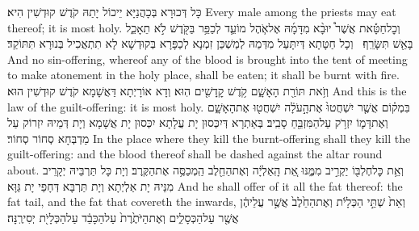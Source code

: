 {כָּל דְּכוּרָא בְּכָהֲנַיָּא יֵיכוֹל יָתַהּ קֹדֶשׁ קוּדְשִׁין הִיא׃}
{Every male among the priests may eat thereof; it is most holy.}{}
{וְכׇל\maqqaf חַטָּ֡את אֲשֶׁר֩ יוּבָ֨א מִדָּמָ֜הּ אֶל\maqqaf אֹ֧הֶל מוֹעֵ֛ד לְכַפֵּ֥ר בַּקֹּ֖דֶשׁ לֹ֣א תֵאָכֵ֑ל בָּאֵ֖שׁ תִּשָּׂרֵֽף׃ \petucha }
{וְכָל חַטָּתָא דְּיִתָּעַל מִדְּמַהּ לְמַשְׁכַּן זִמְנָא לְכַפָּרָא בְּקוּדְשָׁא לָא תִתְאֲכִיל בְּנוּרָא תִּתּוֹקַד׃}
{And no sin-offering, whereof any of the blood is brought into the tent of meeting to make atonement in the holy place, shall be eaten; it shall be burnt with fire.}{}
\newperek
{}%
{וְזֹ֥את תּוֹרַ֖ת הָאָשָׁ֑ם קֹ֥דֶשׁ קׇֽדָשִׁ֖ים הֽוּא׃}
{וְדָא אוֹרָיְתָא דַּאֲשָׁמָא קֹדֶשׁ קוּדְשִׁין הוּא׃}
{And this is the law of the guilt-offering: it is most holy.}{}
{בִּמְק֗וֹם אֲשֶׁ֤ר יִשְׁחֲטוּ֙ אֶת\maqqaf הָ֣עֹלָ֔ה יִשְׁחֲט֖וּ אֶת\maqqaf הָאָשָׁ֑ם וְאֶת\maqqaf דָּמ֛וֹ יִזְרֹ֥ק עַל\maqqaf הַמִּזְבֵּ֖חַ סָבִֽיב׃}
{בְּאַתְרָא דְּיִכְּסוּן יָת עֲלָתָא יִכְּסוּן יָת אֲשָׁמָא וְיָת דְּמֵיהּ יִזְרוֹק עַל מַדְבְּחָא סְחוֹר סְחוֹר׃}
{In the place where they kill the burnt-offering shall they kill the guilt-offering: and the blood thereof shall be dashed against the altar round about.}{}
{וְאֵ֥ת כׇּל\maqqaf חֶלְבּ֖וֹ יַקְרִ֣יב מִמֶּ֑נּוּ אֵ֚ת הָֽאַלְיָ֔ה וְאֶת\maqqaf הַחֵ֖לֶב הַֽמְכַסֶּ֥ה אֶת\maqqaf הַקֶּֽרֶב׃}
{וְיָת כָּל תַּרְבֵּיהּ יְקָרֵיב מִנֵּיהּ יָת אַלְיְתָא וְיָת תַּרְבָּא דְּחָפֵי יָת גַּוָּא׃}
{And he shall offer of it all the fat thereof: the fat tail, and the fat that covereth the inwards,}{}
{וְאֵת֙ שְׁתֵּ֣י הַכְּלָיֹ֔ת וְאֶת\maqqaf הַחֵ֙לֶב֙ אֲשֶׁ֣ר עֲלֵיהֶ֔ן אֲשֶׁ֖ר עַל\maqqaf הַכְּסָלִ֑ים וְאֶת\maqqaf הַיֹּתֶ֙רֶת֙ עַל\maqqaf הַכָּבֵ֔ד עַל\maqqaf הַכְּלָיֹ֖ת יְסִירֶֽנָּה׃}
